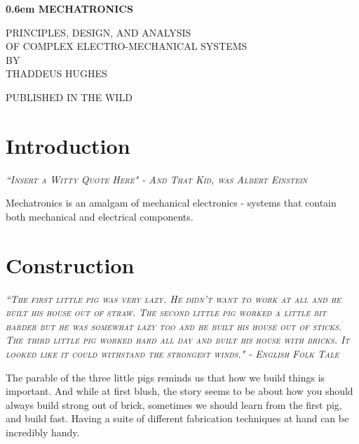 \documentclass[10pt,letterpaper]{book}
\begin{document}
\clearpage
\newcommand\nbvspace[1][3]{\vspace*{\stretch{#1}}}
\newcommand\nbstretchyspace{\spaceskip0.5em plus 0.25em minus 0.25em}
\newcommand{\nbtitlestretch}{\spaceskip0.6em}
\pagestyle{empty}
\begin{center}
  \bfseries
  \nbvspace[1]
  \Huge
  {\nbtitlestretch\huge
    MECHATRONICS}

  \nbvspace[1]
  \normalsize
  PRINCIPLES, DESIGN, AND ANALYSIS\\
  OF COMPLEX ELECTRO-MECHANICAL SYSTEMS\\
  
  \nbvspace[1]
  \small BY\\
  \Large THADDEUS HUGHES\\[0.5em]

  \nbvspace[2]

  \nbvspace[3]
  \normalsize

  \large
  PUBLISHED IN THE WILD
  \nbvspace[1]
\end{center}


\tableofcontents

\chapter{Introduction}
 {\slshape \scshape ``Insert a Witty Quote Here" - And That Kid, was Albert Einstein}

Mechatronics is an amalgam of mechanical electronics - systems that contain both mechanical and electrical components.

\chapter{Construction}
 {\slshape \scshape ``The first little pig was very lazy. He didn't want to work at all and he built his house out of straw. The second little pig worked a little bit harder but he was somewhat lazy too and he built his house out of sticks. The third little pig worked hard all day and built his house with bricks. It looked like it could withstand the strongest winds." - English Folk Tale}
 
 The parable of the three little pigs reminds us that how we build things is important. And while at first blush, the story seems to be about how you should always build strong out of brick, sometimes we should learn from the first pig, and build fast. Having a suite of different fabrication techniques at hand can be incredibly handy.
 
\end{document}
